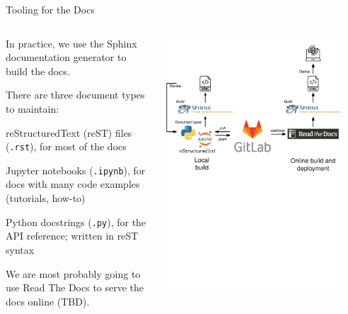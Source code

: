 \documentclass[english,aspectratio=169]{beamer}
\let\tempone\itemize
\let\temptwo\enditemize
\renewenvironment{itemize}{\tempone\addtolength{\itemsep}{0.35\baselineskip}}{\temptwo}
\begin{document}
\begin{frame}{Tooling for the Docs}
\footnotesize

\begin{columns}[onlytextwidth]

\begin{column}{0.5\textwidth}

In practice, we use the Sphinx documentation generator to build the docs.

There are three document types to maintain:

\begin{itemize}
    \item reStructuredText (reST) files (\texttt{.rst}), for most of the docs
    \item Jupyter notebooks (\texttt{.ipynb}),
          for docs with many code examples (tutorials, how-to)
    \item Python docstrings (\texttt{.py}), for the API reference; written in reST syntax
\end{itemize}

We are most probably going to use Read The Docs to serve the docs online (TBD).

\end{column}

\begin{column}{0.5\textwidth}
    \begin{center}
    \includegraphics[width=0.9\textwidth]{./figures/documentation-tooling}
    \end{center}
\end{column}


\end{columns}
\end{frame}
\end{document}
